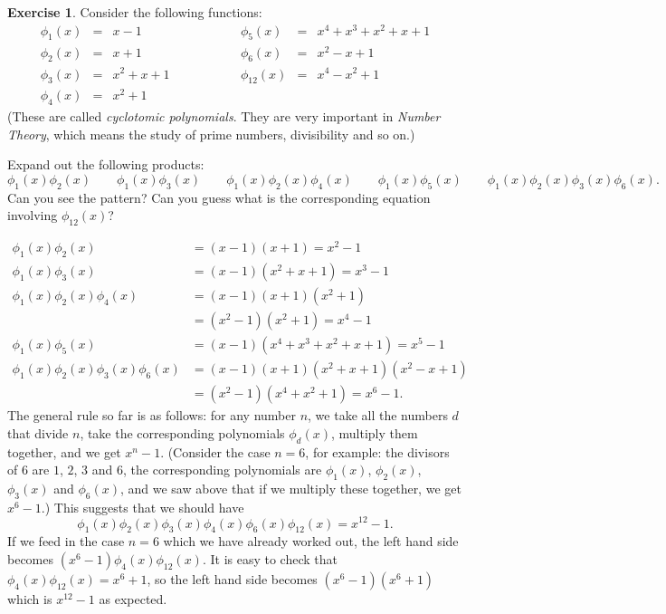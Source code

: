 \documentclass[a4paper]{amsart}
\theoremstyle{definition}
\newtheorem{exercise}{Exercise}[section]
\newenvironment{solution}{{\noindent \bf Solution:}}{}
\begin{document}
\begin{exercise}\label{ex-expand-cyclotomic}
Consider the following functions:
 \[ \begin{array}{rclcrcl}
  \phi_1(x) &=& x - 1 & \hspace{4em} &
   \phi_5(x) &=& x^4 + x^3 + x^2 + x + 1\\
  \phi_2(x) &=& x + 1 &&
   \phi_6(x) &=& x^2 - x + 1\\
  \phi_3(x) &=& x^2 + x + 1 &&
   \phi_{12}(x) &=& x^4 - x^2 + 1 \\
  \phi_4(x) &=& x^2 + 1
 \end{array} \]
 (These are called \emph{cyclotomic polynomials}.  They are
 very important in \emph{Number Theory}, which means the
 study of prime numbers, divisibility and so on.)

 Expand out the following products:
 \[ 
   \phi_1(x)\phi_2(x) \hspace{2em}
   \phi_1(x)\phi_3(x) \hspace{2em}
   \phi_1(x)\phi_2(x)\phi_4(x) \hspace{2em}
   \phi_1(x)\phi_5(x) \hspace{2em}
   \phi_1(x)\phi_2(x)\phi_3(x)\phi_6(x).
 \]
 Can you see the pattern?  Can you guess what is the corresponding
 equation involving $\phi_{12}(x)$?
\end{exercise}
\begin{solution}
\begin{align*}
  \phi_1(x)\phi_2(x) &= (x-1)(x+1) = x^2 - 1 \\
  \phi_1(x)\phi_3(x) &= (x-1)(x^2+x+1) = x^3 - 1 \\
  \phi_1(x)\phi_2(x)\phi_4(x) &= (x-1)(x+1)(x^2+1) \\
                              &= (x^2-1)(x^2+1) = x^4 - 1 \\
  \phi_1(x)\phi_5(x) &= (x-1)(x^4+x^3+x^2+x+1) = x^5 - 1 \\
  \phi_1(x)\phi_2(x)\phi_3(x)\phi_6(x)
   &= (x-1)(x+1)(x^2+x+1)(x^2-x+1) \\
   &= (x^2-1)(x^4+x^2+1) = x^6 - 1.
 \end{align*}
 The general rule so far is as follows: for any number $n$, we take
 all the numbers $d$ that divide $n$, take the corresponding
 polynomials $\phi_d(x)$, multiply them together, and we get $x^n-1$.
 (Consider the case $n=6$, for example: the divisors of $6$ are $1$,
 $2$, $3$ and $6$, the corresponding polynomials are $\phi_1(x)$,
 $\phi_2(x)$, $\phi_3(x)$ and $\phi_6(x)$, and we saw above that if we
 multiply these together, we get $x^6-1$.)  This suggests that we
 should have
 \[ \phi_1(x)\phi_2(x)\phi_3(x)\phi_4(x)\phi_6(x)\phi_{12}(x) =
     x^{12} - 1.
 \]
 If we feed in the case $n=6$ which we have already worked out, the
 left hand side becomes $(x^6-1)\phi_4(x)\phi_{12}(x)$.  It is easy to
 check that $\phi_4(x)\phi_{12}(x)=x^6+1$, so the left hand side
 becomes $(x^6-1)(x^6+1)$ which is $x^{12}-1$ as expected.
\end{solution}
\end{document}
